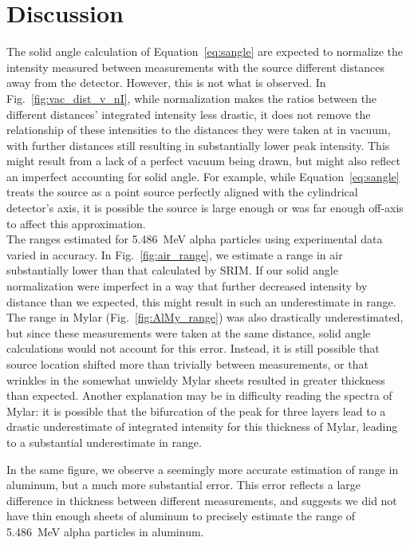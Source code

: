 \documentclass[12pt]{article}
\newcommand{\figref}[1]{Fig.~\ref{#1}}
\begin{document}
\FloatBarrier\section{Discussion}\label{sec:disc}
The solid angle calculation of Equation~\ref{eq:sangle} are expected to normalize the intensity measured between measurements with the source different distances away from the detector.
However, this is not what is observed.
In \figref{fig:vac_dist_v_nI}, while normalization makes the ratios between the different distances' integrated intensity less drastic, it does not remove the relationship of these intensities to the distances they were taken at in vacuum, with further distances still resulting in substantially lower peak intensity.
This might result from a lack of a perfect vacuum being drawn, but might also reflect an imperfect accounting for solid angle.
For example, while Equation~\ref{eq:sangle} treats the source as a point source perfectly aligned with the cylindrical detector's axis, it is possible the source is large enough or was far enough off-axis to affect this approximation.\\

The ranges estimated for 5.486~MeV alpha particles using experimental data varied in accuracy.
In \figref{fig:air_range}, we estimate a range in air substantially lower than that calculated by SRIM.
If our solid angle normalization were imperfect in a way that further decreased intensity by distance than we expected, this might result in such an underestimate in range.
The range in Mylar (\figref{fig:AlMy_range}) was also drastically underestimated, but since these measurements were taken at the same distance, solid angle calculations would not account for this error.
Instead, it is still possible that source location shifted more than trivially between measurements, or that wrinkles in the somewhat unwieldy Mylar sheets resulted in greater thickness than expected.
Another explanation may be in difficulty reading the spectra of Mylar: it is possible that the bifurcation of the peak for three layers lead to a drastic underestimate of integrated intensity for this thickness of Mylar, leading to a substantial underestimate in range.

In the same figure, we observe a seemingly more accurate estimation of range in aluminum, but a much more substantial error.
This error reflects a large difference in thickness between different measurements, and suggests we did not have thin enough sheets of aluminum to precisely estimate the range of 5.486~MeV alpha particles in aluminum.\\
\end{document}
